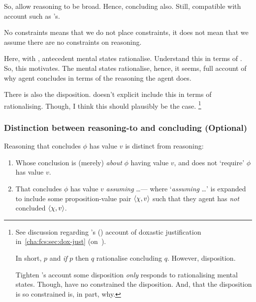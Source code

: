 \begin{note}
  So, allow reasoning to be broad.
  Hence, concluding also.
  Still, compatible with account such as \citeauthor{Wedgwood:2006ui}'s.

  No constraints means that we do not place constraints, it does not mean that we assume there are no constraints on reasoning.
\end{note}

\begin{note}
  Here, with \citeauthor{Wedgwood:2006ui}, antecedent mental states rationalise.
  Understand this in terms of \qWhy{}.
  So, this motivates.
  The mental states rationalise, hence, it seems, full account of why agent concludes in terms of the reasoning the agent does.

  There is also the disposition.
  \citeauthor{Wedgwood:2006ui} doesn't explicit include this in terms of rationalising.
  Though, I think this should plausibly be the case.%
  \footnote{
    See discussion regarding \citeauthor{Turri:2010aa}'s (\citeyear{Turri:2010aa}) account of doxastic justification in~\autoref{cha:fcs:sec:dox-just} (on~).

    In short, \(p\) and \emph{if} \(p\) then \(q\) rationalise concluding \(q\).
    However, disposition.

    Tighten \citeauthor{Wedgwood:2006ui}'s account some disposition \emph{only} responds to rationalising mental states.
    Though, have no constrained the disposition.
    And, that the disposition is so constrained is, in part, why.
  }
\end{note}

\subsubsection[Reasoning-to vs.\ concluding]{Distinction between reasoning-to and concluding \hfill (Optional)}

\begin{note}
  Reasoning that concludes \(\phi\) has value \(v\) is distinct from reasoning:
  \begin{enumerate}[label=\Alph*., ref=(\Alph*)]
  \item
    \label{CS:delicacy:O}
    Whose conclusion is (merely) \emph{about} \(\phi\) having value \(v\), and does not `require' \(\phi\) has value \(v\).
  \item
    \label{CS:delicacy:A}
    That concludes \(\phi\) has value \(v\) \emph{assuming} \dots\space --- where `\emph{assuming} \dots\space' is expanded to include some proposition-value pair \(\langle \chi, v \rangle\) such that they agent has \emph{not} concluded \(\langle \chi, v \rangle\).
  \end{enumerate}
\end{note}

